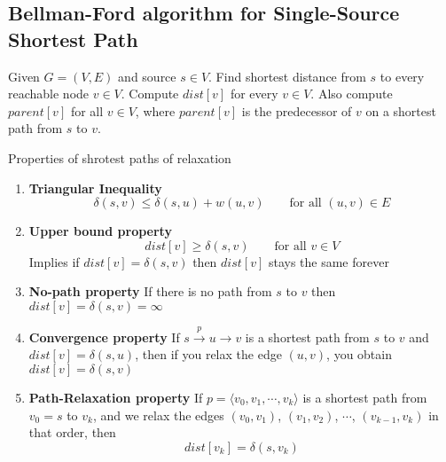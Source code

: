 \documentclass[11pt]{article}
\begin{document}
\subsection*{Bellman-Ford algorithm for Single-Source Shortest Path}
Given $G = (V, E)$ and source $s\in V$. Find shortest distance from $s$ to every reachable node $v\in V$. Compute $dist[v]$ for every $v\in V$. Also compute $parent[v]$ for all $v\in V$, where $parent[v]$ is the predecessor of $v$ on a shortest path from $s$ to $v$.

\begin{algorithm}[H]





\end{algorithm}



\begin{proposition*}
  Properties of shrotest paths of relaxation
  \begin{enumerate}
    \item \textbf{Triangular Inequality}
    \[
      \delta(s, v) \leq \delta(s, u) + w(u, v) \quad \quad \text{for all } (u,v) \in E
    \]
    \item \textbf{Upper bound property}
    \[
      dist[v] \geq \delta(s, v)\quad \quad \text{for all } v\in V
    \]
    Implies if $dist[v] =\delta(s,v)$ then $dist[v]$ stays the same forever
    \item \textbf{No-path property}
    If there is no path from $s$ to $v$ then $dist[v] = \delta(s,v) = \infty$
    \item \textbf{Convergence property} If $s \overset{p}{\to} u \to v$ is a shortest path from $s$ to $v$ and $dist[v] = \delta(s,u)$, then if you relax the edge $(u,v)$, you obtain $dist[v] = \delta(s,v)$
    \item \textbf{Path-Relaxation property} If $p = \langle v_0, v_1, \cdots, v_k \rangle$ is a shortest path from $v_0 = s$ to $v_k$, and we relax the edges $(v_0, v_1)$, $(v_1, v_2)$, $\cdots$, $(v_{k-1}, v_k)$ in that order, then
    \[
      dist[v_k] = \delta(s, v_k)
    \]
  \end{enumerate}
\end{proposition*}
\end{document}
